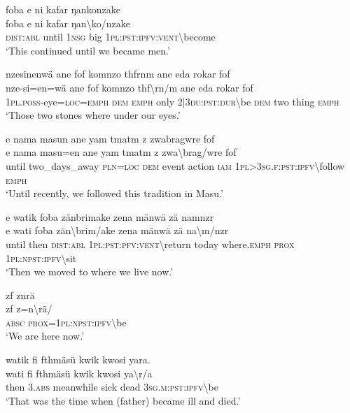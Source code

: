 \ea\label{ex:1:a3851}
foba e ni kafar ŋankonzake\\
\gll foba	e	ni	kafar	ŋan{\textbackslash}ko/nzake\\
     \textsc{dist}:\textsc{abl}	until	1\textsc{nsg}	big	1\textsc{pl}:\textsc{pst}:\textsc{ipfv}:\textsc{vent}{\textbackslash}become\\
\glt `This continued until we became men.'
\z

\ea\label{ex:1:a3852}
nzesinenwä ane fof komnzo thfrnm ane eda rokar fof\\
\gll nze-si=en=wä	ane	fof	komnzo	thf{\textbackslash}rn/m	ane	eda	rokar	fof\\
     1\textsc{pl}.\textsc{poss}-eye=\textsc{loc}=\textsc{emph}	\textsc{dem}	\textsc{emph}	only	2|3\textsc{du}:\textsc{pst}:\textsc{dur}{\textbackslash}be	\textsc{dem}	two	thing	\textsc{emph}\\
\glt `Those two stones where under our eyes.'
\z

\ea\label{ex:1:a3854}
e nama masun ane yam tmatm z zwabragwre fof\\
\gll e	nama	masu=en	ane	yam	tmatm	z	zwa{\textbackslash}brag/wre	fof\\
     until	two\_days\_away	\textsc{pln}=\textsc{loc}	\textsc{dem}	event	action	\textsc{iam}	1\textsc{pl}>3\textsc{sg}.\textsc{f}:\textsc{pst}:\textsc{ipfv}{\textbackslash}follow	\textsc{emph}\\
\glt `Until recently, we followed this tradition in Masu.'
\z

\ea\label{ex:1:a3855}
e watik foba zänbrimake zena mänwä zä namnzr\\
\gll e	wati	foba	zän{\textbackslash}brim/ake	zena	mänwä	zä	na{\textbackslash}m/nzr\\
     until	then	\textsc{dist}:\textsc{abl}	1\textsc{pl}:\textsc{pst}:\textsc{pfv}:\textsc{vent}{\textbackslash}return	today	where.\textsc{emph}	\textsc{prox}	1\textsc{pl}:\textsc{npst}:\textsc{ipfv}{\textbackslash}sit\\
\glt `Then we moved to where we live now.'
\z

\ea\label{ex:1:a3856}
zf znrä\\
\gll zf z=n{\textbackslash}rä/\\
     \textsc{absc} \textsc{prox}=1\textsc{pl}:\textsc{npst}:\textsc{ipfv}{\textbackslash}be\\
\glt `We are here now.'
\z

\ea\label{ex:1:a3857}
watik fi fthmäsü kwik kwosi yara.\\
\gll wati	fi	fthmäsü	kwik	kwosi	ya{\textbackslash}r/a\\
     then	3.\textsc{abs}	meanwhile	sick	dead	3\textsc{sg}.\textsc{m}:\textsc{pst}:\textsc{ipfv}{\textbackslash}be\\
\glt `That was the time when (father) became ill and died.'
\z

